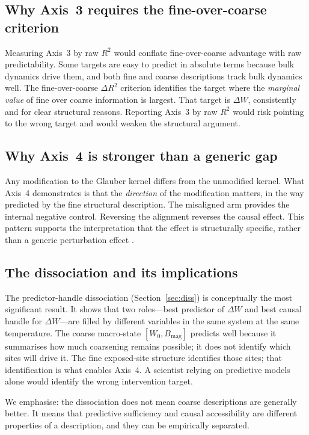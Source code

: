 \documentclass[11pt,a4paper]{article}
\begin{document}
\subsection{Why Axis~3 requires the fine-over-coarse criterion}

Measuring Axis~3 by raw $R^2$ would conflate fine-over-coarse advantage with
raw predictability.
Some targets are easy to predict in absolute terms because bulk dynamics
drive them, and both fine and coarse descriptions track bulk dynamics well.
The fine-over-coarse $\Delta R^2$ criterion identifies the target where
the \textit{marginal value} of fine over coarse information is largest.
That target is $\Delta W$, consistently and for clear structural reasons.
Reporting Axis~3 by raw $R^2$ would risk pointing to the wrong target
and would weaken the structural argument.

\subsection{Why Axis~4 is stronger than a generic gap}

Any modification to the Glauber kernel differs from the unmodified kernel.
What Axis~4 demonstrates is that the \textit{direction} of the modification
matters, in the way predicted by the fine structural description.
The misaligned arm provides the internal negative control.
Reversing the alignment reverses the causal effect.
This pattern supports the interpretation that the effect is structurally
specific, rather than a generic perturbation effect \citep{woodward2003,pearl2009}.

\subsection{The dissociation and its implications}

The predictor-handle dissociation (Section~\ref{sec:diss}) is
conceptually the most significant result.
It shows that two roles---best predictor of $\Delta W$ and best causal
handle for $\Delta W$---are filled by different variables in the same
system at the same temperature.
The coarse macro-state $[W_0, B_\mathrm{mag}]$ predicts well because it
summarises how much coarsening remains possible; it does not identify
which sites will drive it.
The fine exposed-site structure identifies those sites; that identification
is what enables Axis~4.
A scientist relying on predictive models alone would identify the wrong
intervention target.

We emphasise: the dissociation does not mean coarse descriptions are
generally better.
It means that predictive sufficiency and causal accessibility are
different properties of a description, and they can be empirically separated.
\end{document}
